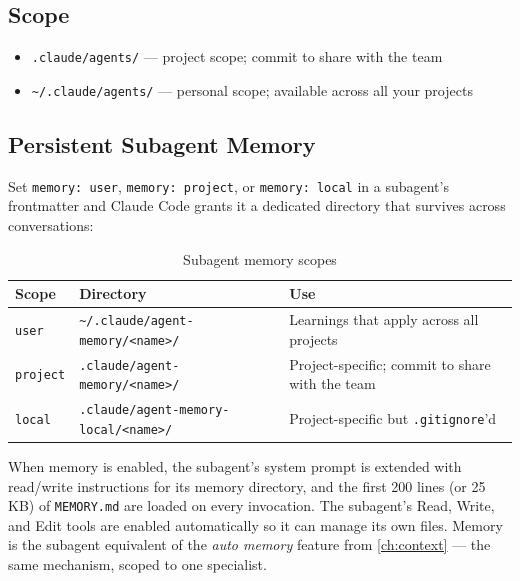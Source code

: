 \subsection{Scope}

\begin{itemize}
  \item \texttt{.claude/agents/} — project scope; commit to share with the team
  \item \texttt{\textasciitilde/.claude/agents/} — personal scope; available
        across all your projects
\end{itemize}

\subsection{Persistent Subagent Memory}
\label{sec:agent-memory}


Set \texttt{memory: user}, \texttt{memory: project}, or
\texttt{memory: local} in a subagent's frontmatter and Claude Code grants
it a dedicated directory that survives across conversations:

\begin{table}[ht]
\centering
\caption{Subagent memory scopes}
\label{tab:agent-memory}
\begin{tabularx}{\textwidth}{llX}
\toprule
\textbf{Scope} & \textbf{Directory} & \textbf{Use} \\
\midrule
\texttt{user}    & \texttt{\textasciitilde/.claude/agent-memory/<name>/}
                 & Learnings that apply across all projects \\
\texttt{project} & \texttt{.claude/agent-memory/<name>/}
                 & Project-specific; commit to share with the team \\
\texttt{local}   & \texttt{.claude/agent-memory-local/<name>/}
                 & Project-specific but \texttt{.gitignore}'d \\
\bottomrule
\end{tabularx}
\end{table}

When memory is enabled, the subagent's system prompt is extended with
read/write instructions for its memory directory, and the first 200 lines
(or 25\,KB) of \texttt{MEMORY.md} are loaded on every invocation. The
subagent's Read, Write, and Edit tools are enabled automatically so it can
manage its own files. Memory is the subagent equivalent of the
\emph{auto memory} feature from \cref{ch:context} — the same mechanism,
scoped to one specialist.

